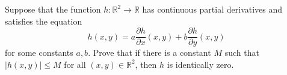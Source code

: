 Suppose that the function $h:\mathbb{R}^2\to\mathbb{R}$ has continuous partial derivatives and satisfies the equation
\[
	h(x,y)=a\frac{\partial h}{\partial x}(x,y)+b\frac{\partial h}{\partial y}(x,y)
\]
for some constants $a,b$. Prove that if there is a constant $M$ such that $|h(x,y)|\leq M$ for all $(x,y)\in\mathbb{R}^2$, then $h$ is identically zero.